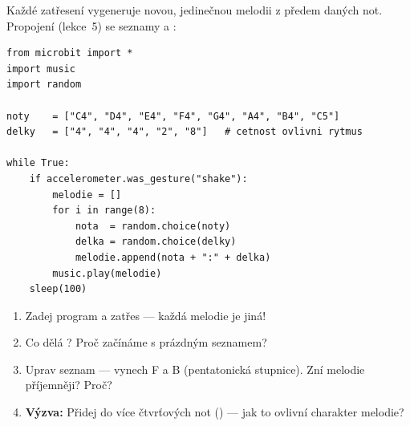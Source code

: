 \begin{bonusukol}

Každé zatřesení vygeneruje novou, jedinečnou melodii z předem daných not.
Propojení  (lekce~5) se seznamy a :

\begin{lstlisting}
from microbit import *
import music
import random

noty    = ["C4", "D4", "E4", "F4", "G4", "A4", "B4", "C5"]
delky   = ["4", "4", "4", "2", "8"]   # cetnost ovlivni rytmus

while True:
    if accelerometer.was_gesture("shake"):
        melodie = []
        for i in range(8):
            nota  = random.choice(noty)
            delka = random.choice(delky)
            melodie.append(nota + ":" + delka)
        music.play(melodie)
    sleep(100)
\end{lstlisting}

\begin{enumerate}
  \item Zadej program a zatřes — každá melodie je jiná!
  \item Co dělá ? Proč začínáme s prázdným seznamem?
  \item Uprav seznam  — vynech F a B (pentatonická stupnice).
        Zní melodie příjemněji? Proč?
  \item \textbf{Výzva:} Přidej do  více čtvrťových not
        () — jak to ovlivní charakter melodie?
\end{enumerate}

\odpoved[2.5cm]

\end{bonusukol}


